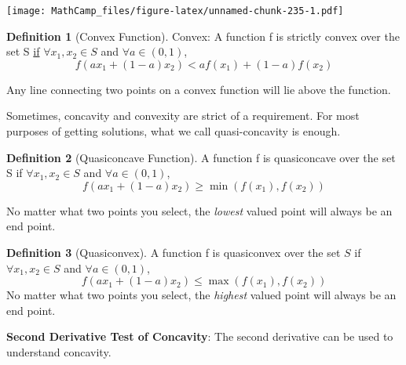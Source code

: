 \documentclass[
]{book}
\theoremstyle{definition}
\newtheorem{definition}{Definition}[chapter]
\theoremstyle{definition}
\theoremstyle{definition}
\theoremstyle{definition}
\theoremstyle{remark}
\begin{document}
\texttt{[image: MathCamp\_files/figure-latex/unnamed-chunk-235-1.pdf]}

\begin{definition}[Convex Function]
\protect\hypertarget{def:unnamed-chunk-236}{}{\label{def:unnamed-chunk-236} {} }Convex: A function f is strictly convex over the set S \underline{if} \(\forall x_1,x_2 \in S\) and \(\forall a \in (0,1)\), \[f(ax_1 + (1-a)x_2) < af(x_1) + (1-a)f(x_2)\]

Any line connecting two points on a convex function will lie above the function.
\end{definition}

Sometimes, concavity and convexity are strict of a requirement. For most purposes of getting solutions, what we call quasi-concavity is enough.

\begin{definition}[Quasiconcave Function]
\protect\hypertarget{def:unnamed-chunk-237}{}{\label{def:unnamed-chunk-237} {} }A function f is quasiconcave over the set S if \(\forall x_1,x_2 \in S\) and \(\forall a \in (0,1)\), \[f(ax_1 + (1-a)x_2) \ge \min(f(x_1),f(x_2))\]

No matter what two points you select, the \textit{lowest} valued point will always be an end point.
\end{definition}

\begin{definition}[Quasiconvex]
\protect\hypertarget{def:unnamed-chunk-238}{}{\label{def:unnamed-chunk-238} {} }A function f is quasiconvex over the set \(S\) if \(\forall x_1,x_2 \in S\) and \(\forall a \in (0,1)\), \[f(ax_1 + (1-a)x_2) \le \max(f(x_1),f(x_2))\]
No matter what two points you select, the \textit{highest} valued point will always be an end point.
\end{definition}

\textbf{Second Derivative Test of Concavity}: The second derivative can be used to understand concavity.
\end{document}
